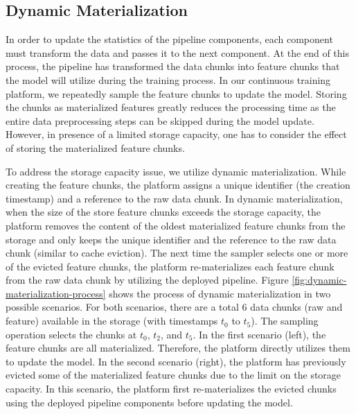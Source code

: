 \subsection{Dynamic Materialization}\label{subsec:dynamic-materialization}
In order to update the statistics of the pipeline components, each component must transform the data and passes it to the next component.
At the end of this process, the pipeline has transformed the data chunks into feature chunks that the model will utilize during the training process.
In our continuous training platform, we repeatedly sample the feature chunks to update the model.
Storing the chunks as materialized features greatly reduces the processing time as the entire data preprocessing steps can be skipped during the model update.
However, in presence of a limited storage capacity, one has to consider the effect of storing the materialized feature chunks.

To address the storage capacity issue, we utilize dynamic materialization.
While creating the feature chunks, the platform assigns a unique identifier (the creation timestamp) and a reference to the raw data chunk.
In dynamic materialization, when the size of the store feature chunks exceeds the storage capacity, the platform removes the content of the oldest materialized feature chunks from the storage and only keeps the unique identifier and the reference to the raw data chunk (similar to cache eviction).
The next time the sampler selects one or more of the evicted feature chunks, the platform re-materializes each feature chunk from the raw data chunk by utilizing the deployed pipeline.
Figure \ref{fig:dynamic-materialization-process} shows the process of dynamic materialization in two possible scenarios.
For both scenarios, there are a total 6 data chunks (raw and feature) available in the storage (with timestamps $t_0$ to $t_5$).
The sampling operation selects the chunks at $t_0$, $t_2$, and $t_5$.
In the first scenario (left), the feature chunks are all materialized.
Therefore, the platform directly utilizes them to update the model.
In the second scenario (right), the platform has previously evicted some of the materialized feature chunks due to the limit on the storage capacity.
In this scenario, the platform first re-materializes the evicted chunks using the deployed pipeline components before updating the model.

